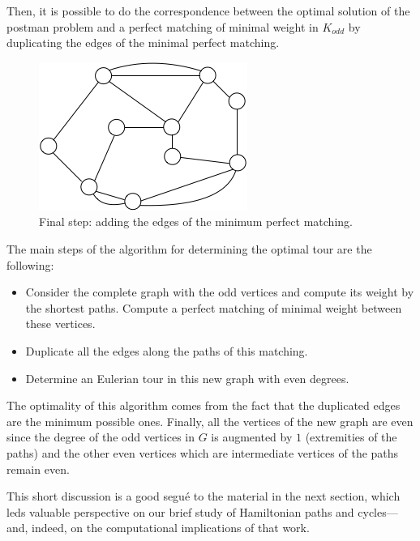 Then, it is possible to do the correspondence between the optimal solution of the postman problem and a perfect matching of minimal weight in $K_{odd}$
by duplicating the edges of the minimal perfect matching.

\begin{figure}[hbt]
\begin{center}
       \includegraphics[scale=0.6]{FiguresGraph/EulerienFinal}
       \caption{Final step: adding the edges of the minimum perfect matching.}
              \label{fig:EulerianFinal}
\end{center}
\end{figure}

The main steps of the algorithm for determining the optimal tour are the following:

\begin{itemize}
\item Consider the complete graph with the odd vertices and compute its weight by the shortest paths.
Compute a perfect matching of minimal weight between these vertices. 
\item Duplicate all the edges along the paths of this matching.
\item Determine an Eulerian tour in this new graph with even degrees.
\end{itemize}

The optimality of this algorithm comes from the fact that the duplicated edges are the minimum possible ones.
Finally, all the vertices of the new graph are even since the degree of the odd vertices in $G$ is augmented by $1$
(extremities of the paths) and the other even vertices which are intermediate vertices of the paths remain even. 

\medskip

This short discussion is a good segu\'{e} to the material in the next
section, which leds valuable perspective on our brief study of
Hamiltonian paths and cycles---and, indeed, on the computational
implications of that work.

